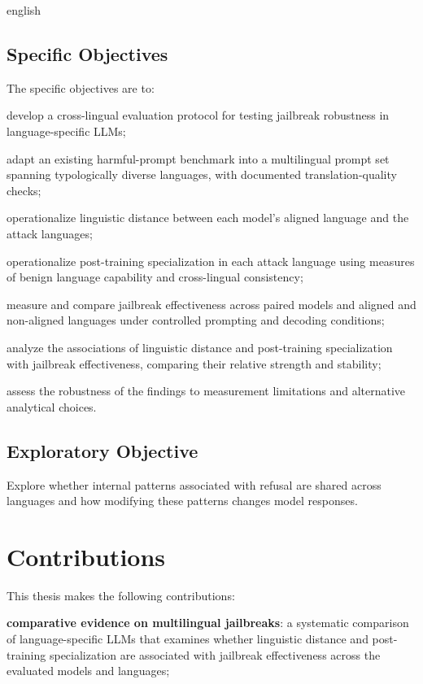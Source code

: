 \begin{otherlanguage*}{english}
\subsection{Specific Objectives}
The specific objectives are to:
\begin{alineas}
    \item develop a cross-lingual evaluation protocol for testing jailbreak robustness in language-specific LLMs;

    \item adapt an existing harmful-prompt benchmark into a multilingual prompt set spanning typologically diverse languages, with documented translation-quality checks;

    \item operationalize linguistic distance between each model's aligned language and the attack languages;

    \item operationalize post-training specialization in each attack language using measures of benign language capability and cross-lingual consistency;

    \item measure and compare jailbreak effectiveness across paired models and aligned and non-aligned languages under controlled prompting and decoding conditions;

    \item analyze the associations of linguistic distance and post-training specialization with jailbreak effectiveness, comparing their relative strength and stability;

    \item assess the robustness of the findings to measurement limitations and alternative analytical choices.
\end{alineas}

\subsection{Exploratory Objective}
Explore whether internal patterns associated with refusal are shared across languages and how modifying these patterns changes model responses.

\section{Contributions}

This thesis makes the following contributions:

\begin{alineas}
    \item \textbf{comparative evidence on multilingual jailbreaks}: a systematic comparison of language-specific LLMs that examines whether linguistic distance and post-training specialization are associated with jailbreak effectiveness across the evaluated models and languages;


\end{alineas}
\end{otherlanguage*}
